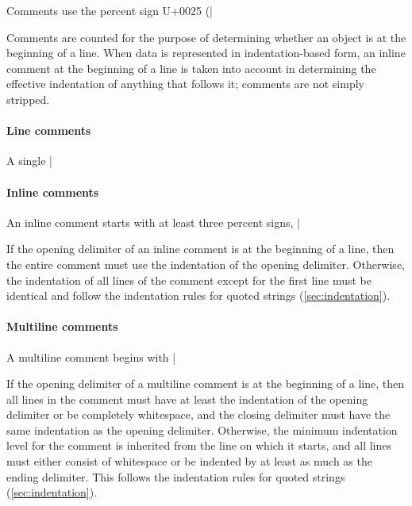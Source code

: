 \documentclass[11pt]{article}
\begin{document}
Comments use the percent sign U+0025 (|%

Comments are counted for the purpose of determining whether an object is at the beginning of a line.  When data is represented in indentation-based form, an inline comment at the beginning of a line is taken into account in determining the effective indentation of anything that follows it; comments are not simply stripped.

\paragraph{Line comments}

A single |%


\paragraph{Inline comments}

An inline comment starts with at least three percent signs, |%

If the opening delimiter of an inline comment is at the beginning of a line, then the entire comment must use the indentation of the opening delimiter.  Otherwise, the indentation of all lines of the comment except for the first line must be identical and follow the indentation rules for quoted strings (\cref{sec:indentation}).


\paragraph{Multiline comments}

A multiline comment begins with |%

If the opening delimiter of a multiline comment is at the beginning of a line, then all lines in the comment must have at least the indentation of the opening delimiter or be completely whitespace, and the closing delimiter must have the same indentation as the opening delimiter.  Otherwise, the minimum indentation level for the comment is inherited from the line on which it starts, and all lines must either consist of whitespace or be indented by at least as much as the ending delimiter. This follows the indentation rules for quoted strings (\cref{sec:indentation}).
\end{document}

